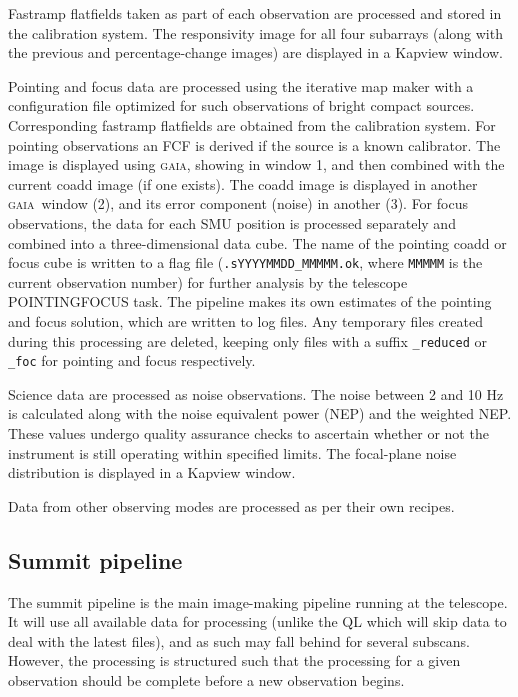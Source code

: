 \documentclass[twoside,11pt]{article}
\renewcommand{\_}{\texttt{\symbol{95}}}
\newcommand{\GAIA}{\textsc{gaia}}
\begin{document}
Fastramp flatfields taken as part of each observation are processed
and stored in the calibration system. The responsivity image for all
four subarrays (along with the previous and percentage-change images)
are displayed in a Kapview window.

Pointing and focus data are processed using the iterative map maker
with a configuration file optimized for such observations of bright
compact sources. Corresponding fastramp flatfields are obtained from
the calibration system. For pointing observations an FCF is derived if
the source is a known calibrator. The image is displayed using \GAIA,
showing in window 1, and then combined with the current coadd image
(if one exists). The coadd image is displayed in another \GAIA\ window
(2), and its error component (noise) in another (3). For focus
observations, the data for each SMU position is processed separately
and combined into a three-dimensional data cube. The name of the
pointing coadd or focus cube is written to a flag file
(\verb+.sYYYYMMDD_MMMMM.ok+, where \verb+MMMMM+ is the current
observation number) for further analysis by the telescope
POINTING\_FOCUS task. The pipeline makes its own estimates of the
pointing and focus solution, which are written to log files. Any
temporary files created during this processing are deleted, keeping
only files with a suffix \verb+_reduced+ or \verb+_foc+ for pointing
and focus respectively.

Science data are processed as noise observations. The noise between 2
and 10 Hz is calculated along with the noise equivalent power (NEP)
and the weighted NEP. These values undergo quality assurance checks to
ascertain whether or not the instrument is still operating within
specified limits. The focal-plane noise distribution is displayed in a
Kapview window.

Data from other observing modes are processed as per their own recipes.

\subsection{Summit pipeline}

The summit pipeline is the main image-making pipeline running at the
telescope. It will use all available data for processing (unlike the
QL which will skip data to deal with the latest files), and as such
may fall behind for several subscans. However, the processing is
structured such that the processing for a given observation should be
complete before a new observation begins.
\end{document}
